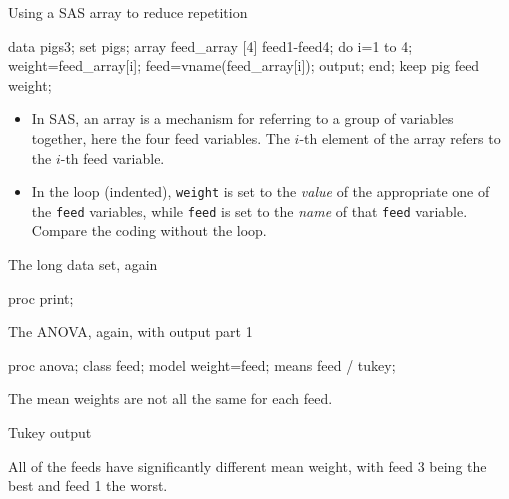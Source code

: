 \documentclass[unknownkeysallowed]{beamer}\usepackage[]{graphicx}\usepackage[]{color}
\begin{document}
\begin{frame}[fragile]{Using a SAS array to reduce repetition}

  \begin{Datastep}
data pigs3;
  set pigs;
  array feed_array [4] feed1-feed4;
  do i=1 to 4;
    weight=feed_array[i];
    feed=vname(feed_array[i]);
    output;
  end;
  keep pig feed weight;
  \end{Datastep}
  
  \begin{itemize}
  \item   In SAS, an array is a mechanism for referring to a group of
  variables together, here the four feed variables. The $i$-th element
  of the array refers to the $i$-th feed variable.
\item In the loop (indented), \texttt{weight} is set to the
  \emph{value} of the appropriate one of the \texttt{feed} variables,
  while \texttt{feed} is set to the \emph{name} of that \texttt{feed}
  variable. Compare the coding without the loop.
  \end{itemize}
  
  
\end{frame}

\begin{frame}[fragile]{The long data set, again}
  
  \begin{Sascode}[store=tp]
proc print;    
  \end{Sascode}
  
  
\end{frame}

\begin{frame}[fragile]{The ANOVA, again, with output part 1}
  
  \begin{Sascode}[store=tr]
proc anova;
  class feed;
  model weight=feed;
  means feed / tukey;
  \end{Sascode}
  

The mean weights are not all the same for each feed.

\end{frame}

\begin{frame}[fragile]{Tukey output}
  
  

All of the feeds have significantly different mean weight, with feed 3
being the best and feed 1 the worst.
\end{frame}
\end{document}
